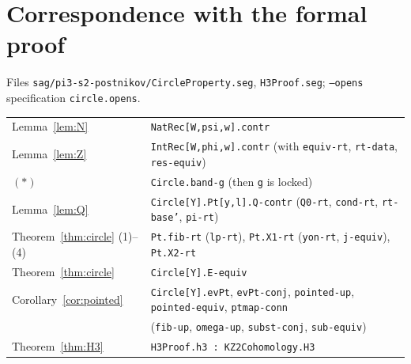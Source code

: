 \documentclass[11pt]{amsart}
\theoremstyle{definition}
\theoremstyle{remark}
\newcommand{\code}[1]{\texttt{#1}}
\begin{document}
\section{Correspondence with the formal proof}\label{sec:corr}

\noindent Files \code{sag/pi3-s2-postnikov/CircleProperty.seg},
\code{H3Proof.seg}; \code{--opens} specification \code{circle.opens}.

\smallskip
\begin{tabular}{ll}
Lemma~\ref{lem:N} & \code{NatRec[W,psi,w].contr}\\
Lemma~\ref{lem:Z} & \code{IntRec[W,phi,w].contr} (with \code{equiv-rt}, \code{rt-data}, \code{res-equiv})\\
$(\ast)$ & \code{Circle.band-g} (then \code{g} is locked)\\
Lemma~\ref{lem:Q} & \code{Circle[Y].Pt[y,l].Q-contr} (\code{Q0-rt}, \code{cond-rt}, \code{rt-base'}, \code{pi-rt})\\
Theorem~\ref{thm:circle} (1)--(4) & \code{Pt.fib-rt} (\code{lp-rt}), \code{Pt.X1-rt} (\code{yon-rt}, \code{j-equiv}), \code{Pt.X2-rt}\\
Theorem~\ref{thm:circle} & \code{Circle[Y].E-equiv}\\
Corollary~\ref{cor:pointed} & \code{Circle[Y].evPt}, \code{evPt-conj}, \code{pointed-up}, \code{pointed-equiv}, \code{ptmap-conn}\\
 & (\code{fib-up}, \code{omega-up}, \code{subst-conj}, \code{sub-equiv})\\
Theorem~\ref{thm:H3} & \code{H3Proof.h3 : KZ2Cohomology.H3}
\end{tabular}
\end{document}

